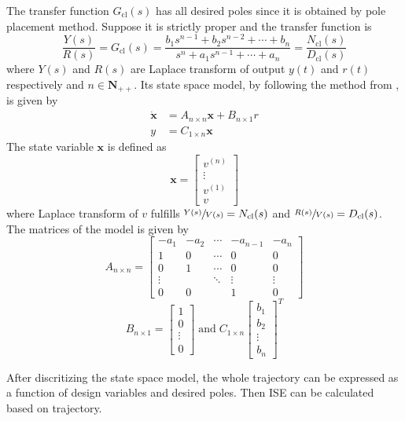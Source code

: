 The transfer function $G_{\text{cl}}(s)$ has all desired poles since it is  obtained by pole placement method. Suppose it is strictly proper and the transfer function is 
$$\frac{Y(s)}{R(s)}=G_{\text{cl}}(s)=\frac{b_1s^{n-1}+b_2s^{n-2}+ \cdots +b_n}{s^n+a_1s^{n-1}+ \cdots + a_n}=\frac{N_\text{cl}(s)}{D_{\text{cl}}(s)}$$ where $Y(s)$ and $R(s)$ are Laplace transform of output $y(t)$ and $r(t)$ respectively and $n \in \mathbf{N_{++}}$. Its state space model, by following the method from \cite{astrom2010feedback}, is given by 
\begin{equation}\label{eq:st_sp}
\begin{aligned} 
\dot{\mathbf{x}}&=A_{n \times n}\mathbf{x}+B_{n \times 1}r\\
y&=C_{1 \times n} \mathbf{x}
\end{aligned} 
\end{equation}
The state variable $\mathbf{x}$ is defined as $$\mathbf{x}=\left[\begin{array}{c}v^{(n)}\\ \vdots \\v^{(1)}\\v \end{array}\right]$$ where Laplace transform of $v$ fulfills $\sfrac{Y(s)}{V(s)}=N_{\text{cl}}(s)$ and $\sfrac{R(s)}{V(s)}=D_{\text{cl}}(s)$. The matrices of the model is given by $$ A_{n \times n} = 
 \left[\begin{array}{ccccc}
  -a_1 & -a_2 & \cdots & -a_{n-1} & -a_n \\
  1 &	0 & \cdots & 0 & 0 \\
  0 &	1 & \cdots & 0 & 0 \\
  \vdots  &   & \ddots & \vdots& \vdots  \\
  0 & 0 &  & 1 & 0
 \end{array}\right] $$ $$ B_{n \times 1} = \left[\begin{array}{c}1\\0\\ \vdots \\ 0 \end{array}\right]\; \text{and}\; C_{1 \times n} \left[\begin{array}{c}b_1\\b_2\\ \vdots \\ b_n \end{array}\right]^T $$
 
After discritizing the state space model, the whole trajectory can be expressed as a function of design variables and desired poles. Then ISE can be calculated based on trajectory.  